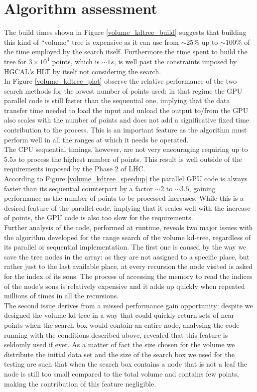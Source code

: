 \section{Algorithm assessment}
The build times shown in Figure \ref{volume_kdtree_build} suggests that building this kind of ``volume'' tree is expensive as it can use from $\sim 25\%$ up to $\sim 100\%$ of the time employed by the search itself. Furthermore the time spent to build the tree for $3 \times 10^{4}$ points, which is $\sim 1\unit{s}$, is well past the constraints imposed by HGCAL's HLT by itself not considering the search.\\
In Figure \ref{volume_kdtree_plot} observe the relative performance of the two search methods for the lowest number of points used: in that regime the GPU parallel code is still faster than the sequential one, implying that the data transfer time needed to load the input and unload the output to/from the GPU also scales with the number of points and does not add a significative fixed time contribution to the process. This is an important feature as the algorithm must perform well in all the ranges at which it needs be operated.\\
The CPU sequential timings, however, are not very encouraging requiring up to $5.5 \unit{s}$ to process the highest number of points. This result is well outside of the requirements imposed by the Phase 2 of LHC.\\
According to Figure \ref{volume_kdtree_speedup} the parallel GPU code is always faster than its sequential counterpart by a factor $\sim 2$ to $\sim 3.5$, gaining performance as the number of points to be processed increases. While this is a desired feature of the parallel code, implying that it scales well with the increase of points, the GPU code is also too slow for the requirements.\\
Further analysis of the code, performed at runtime, reveals two major issues with the algorithm developed for the range search of the volume kd-tree, regardless of its parallel or sequential implementation. The first one is caused by the way we save the tree nodes in the array: as they are not assigned to a specific place, but rather just to the last available place, at every recursion the node visited is asked for the index of its sons. The process of accessing the memory to read the indices of the node's sons is relatively expensive and it adds up quickly when repeated millions of times in all the recursions.\\
The second issue derives from a missed performance gain opportunity: despite we designed the volume kd-tree in a way that could quickly return sets of near points when the search box would contain an entire node, analysing the code running with the conditions described above, revealed that this feature is seldomly used if ever. As a matter of fact the size chosen for the volume we distribute the initial data set and the size of the search box we used for the testing are such that when the search box contains a node that is not a leaf the node is still too small compared to the total volume and contains few points, making the contribution of this feature negligible.\\

